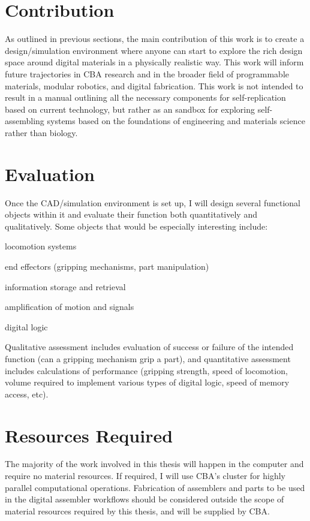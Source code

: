 {\section{Contribution}

As outlined in previous sections, the main contribution of this work is to create a design/simulation environment where anyone can start to explore the rich design space around digital materials in a physically realistic way.  This work will inform future trajectories in CBA research and in the broader field of programmable materials, modular robotics, and digital fabrication.  This work is not intended to result in a manual outlining all the necessary components for self-replication based on current technology, but rather as an sandbox for exploring self-assembling systems based on the foundations of engineering and materials science rather than biology.

\section{Evaluation}

Once the CAD/simulation environment is set up, I will design several functional objects within it and evaluate their function both quantitatively and qualitatively.  Some objects that would be especially interesting include:
\begin{description}
\setlength\itemsep{0em}
\item[] locomotion systems
\item[] end effectors (gripping mechanisms, part manipulation)
\item[] information storage and retrieval
\item[] amplification of motion and signals
\item[] digital logic
\end{description}
Qualitative assessment includes evaluation of success or failure of the intended function (can a gripping mechanism grip a part), and quantitative assessment includes calculations of performance (gripping strength, speed of locomotion, volume required to implement various types of digital logic, speed of memory access, etc).

\section{Resources Required}

The majority of the work involved in this thesis will happen in the computer and require no material resources.  If required, I will use CBA's cluster for highly parallel computational operations.  Fabrication of assemblers and parts to be used in the digital assembler workflows should be considered outside the scope of material resources required by this thesis, and will be supplied by CBA.

}
